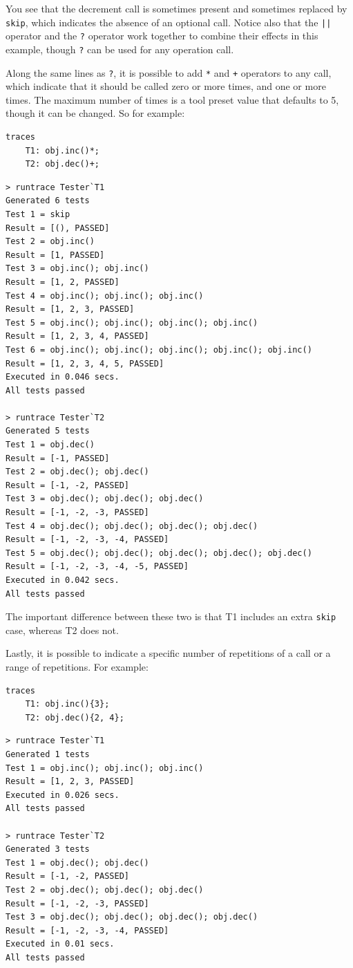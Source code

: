 \documentclass{overturerepchap}
\begin{document}
You see that the decrement call is sometimes present and sometimes replaced by
\texttt{skip}, which indicates the absence of an optional call. Notice also that
the \texttt{||} operator and the \texttt{?} operator work together to combine their
effects in this example, though \texttt{?} can be used for any operation call.

Along the same lines as \texttt{?}, it is possible to add \texttt{*} and
\texttt{+} operators to any call, which indicate that it should be called zero
or more times, and one or more times. The maximum number of times is a tool preset
value that defaults to 5, though it can be changed. So for example:

\small
\begin{lstlisting}
traces
    T1: obj.inc()*;
    T2: obj.dec()+;
\end{lstlisting}

\begin{verbatim}
> runtrace Tester`T1
Generated 6 tests
Test 1 = skip
Result = [(), PASSED]
Test 2 = obj.inc()
Result = [1, PASSED]
Test 3 = obj.inc(); obj.inc()
Result = [1, 2, PASSED]
Test 4 = obj.inc(); obj.inc(); obj.inc()
Result = [1, 2, 3, PASSED]
Test 5 = obj.inc(); obj.inc(); obj.inc(); obj.inc()
Result = [1, 2, 3, 4, PASSED]
Test 6 = obj.inc(); obj.inc(); obj.inc(); obj.inc(); obj.inc()
Result = [1, 2, 3, 4, 5, PASSED]
Executed in 0.046 secs. 
All tests passed

> runtrace Tester`T2
Generated 5 tests
Test 1 = obj.dec()
Result = [-1, PASSED]
Test 2 = obj.dec(); obj.dec()
Result = [-1, -2, PASSED]
Test 3 = obj.dec(); obj.dec(); obj.dec()
Result = [-1, -2, -3, PASSED]
Test 4 = obj.dec(); obj.dec(); obj.dec(); obj.dec()
Result = [-1, -2, -3, -4, PASSED]
Test 5 = obj.dec(); obj.dec(); obj.dec(); obj.dec(); obj.dec()
Result = [-1, -2, -3, -4, -5, PASSED]
Executed in 0.042 secs. 
All tests passed
\end{verbatim}
\normalsize

The important difference between these two is that T1 includes an extra
\texttt{skip} case, whereas T2 does not.

Lastly, it is possible to indicate a specific number of repetitions of a call or
a range of repetitions. For example:

\small
\begin{lstlisting}
traces
    T1: obj.inc(){3};
    T2: obj.dec(){2, 4};
\end{lstlisting}

\begin{verbatim}
> runtrace Tester`T1
Generated 1 tests
Test 1 = obj.inc(); obj.inc(); obj.inc()
Result = [1, 2, 3, PASSED]
Executed in 0.026 secs. 
All tests passed

> runtrace Tester`T2
Generated 3 tests
Test 1 = obj.dec(); obj.dec()
Result = [-1, -2, PASSED]
Test 2 = obj.dec(); obj.dec(); obj.dec()
Result = [-1, -2, -3, PASSED]
Test 3 = obj.dec(); obj.dec(); obj.dec(); obj.dec()
Result = [-1, -2, -3, -4, PASSED]
Executed in 0.01 secs. 
All tests passed
\end{verbatim}
\normalsize
\end{document}
